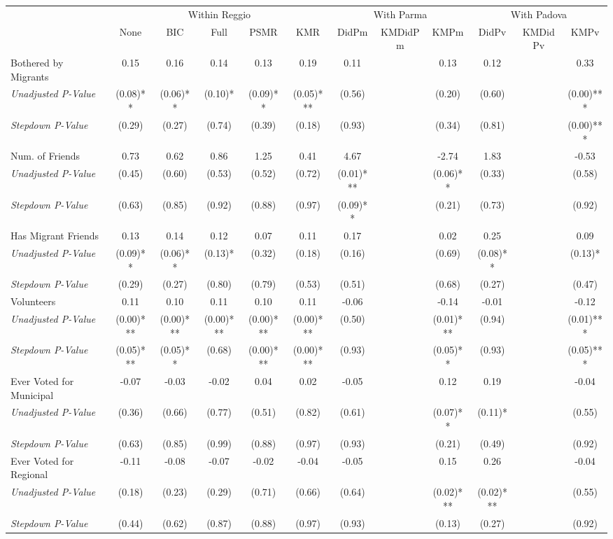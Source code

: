 \begin{tabular}{l c c c c c c c c c c c}
\toprule
& \multicolumn{5}{c}{Within Reggio} & \multicolumn{3}{c}{With Parma} & \multicolumn{3}{c}{With Padova} \\\cmidrule(lr){2-6} \cmidrule(lr){7-9} \cmidrule(lr){10-12}
 & None & BIC & Full & PSMR & KMR & DidPm & KMDidPm & KMPm & DidPv & KMDidPv & KMPv \\
\midrule
Bothered by Migrants & 0.15 & 0.16 & 0.14 & 0.13 & 0.19 & 0.11 & & 0.13 & 0.12 & & 0.33 \\
\quad \textit{Unadjusted P-Value} & (0.08)** & (0.06)** & (0.10)* & (0.09)** & (0.05)*** & (0.56) & & (0.20) & (0.60) & & (0.00)*** \\
\quad \textit{Stepdown P-Value} & (0.29) & (0.27) & (0.74) & (0.39) & (0.18) & (0.93) & & (0.34) & (0.81) & & (0.00)*** \\
Num. of Friends & 0.73 & 0.62 & 0.86 & 1.25 & 0.41 & 4.67 & & -2.74 & 1.83 & & -0.53 \\
\quad \textit{Unadjusted P-Value} & (0.45) & (0.60) & (0.53) & (0.52) & (0.72) & (0.01)*** & & (0.06)** & (0.33) & & (0.58) \\
\quad \textit{Stepdown P-Value} & (0.63) & (0.85) & (0.92) & (0.88) & (0.97) & (0.09)** & & (0.21) & (0.73) & & (0.92) \\
Has Migrant Friends & 0.13 & 0.14 & 0.12 & 0.07 & 0.11 & 0.17 & & 0.02 & 0.25 & & 0.09 \\
\quad \textit{Unadjusted P-Value} & (0.09)** & (0.06)** & (0.13)* & (0.32) & (0.18) & (0.16) & & (0.69) & (0.08)** & & (0.13)* \\
\quad \textit{Stepdown P-Value} & (0.29) & (0.27) & (0.80) & (0.79) & (0.53) & (0.51) & & (0.68) & (0.27) & & (0.47) \\
Volunteers & 0.11 & 0.10 & 0.11 & 0.10 & 0.11 & -0.06 & & -0.14 & -0.01 & & -0.12 \\
\quad \textit{Unadjusted P-Value} & (0.00)*** & (0.00)*** & (0.00)*** & (0.00)*** & (0.00)*** & (0.50) & & (0.01)*** & (0.94) & & (0.01)*** \\
\quad \textit{Stepdown P-Value} & (0.05)*** & (0.05)** & (0.68) & (0.00)*** & (0.00)*** & (0.93) & & (0.05)** & (0.93) & & (0.05)*** \\
Ever Voted for Municipal & -0.07 & -0.03 & -0.02 & 0.04 & 0.02 & -0.05 & & 0.12 & 0.19 & & -0.04 \\
\quad \textit{Unadjusted P-Value} & (0.36) & (0.66) & (0.77) & (0.51) & (0.82) & (0.61) & & (0.07)** & (0.11)* & & (0.55) \\
\quad \textit{Stepdown P-Value} & (0.63) & (0.85) & (0.99) & (0.88) & (0.97) & (0.93) & & (0.21) & (0.49) & & (0.92) \\
Ever Voted for Regional & -0.11 & -0.08 & -0.07 & -0.02 & -0.04 & -0.05 & & 0.15 & 0.26 & & -0.04 \\
\quad \textit{Unadjusted P-Value} & (0.18) & (0.23) & (0.29) & (0.71) & (0.66) & (0.64) & & (0.02)*** & (0.02)*** & & (0.55) \\
\quad \textit{Stepdown P-Value} & (0.44) & (0.62) & (0.87) & (0.88) & (0.97) & (0.93) & & (0.13) & (0.27) & & (0.92) \\
\bottomrule
\end{tabular}
